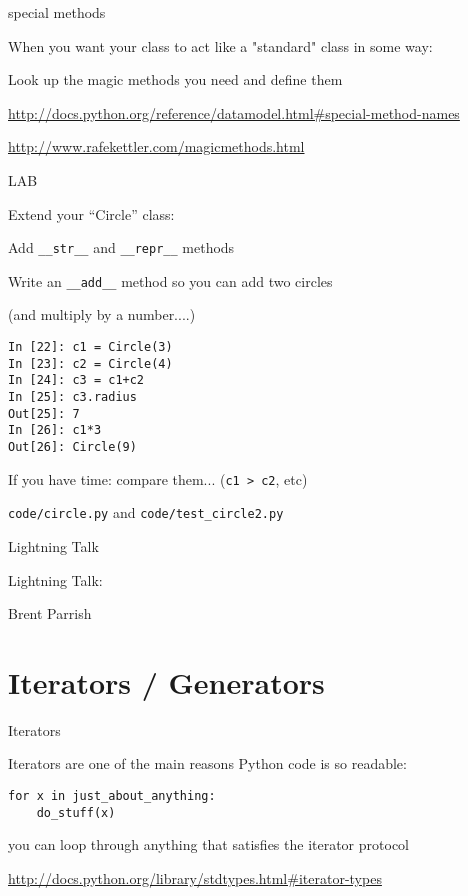 \documentclass{beamer}
\begin{document}
\begin{frame}[fragile]{special methods}

\vfill
{\Large When you want your class to act like a "standard" class in some way:}

\vfill
{\Large Look up the magic methods you need and define them}

\vfill
\url{http://docs.python.org/reference/datamodel.html#special-method-names}

\vfill
\url{http://www.rafekettler.com/magicmethods.html}
\end{frame} 

\begin{frame}[fragile]{LAB}

{\Large Extend your ``Circle'' class:}

\vfill
{\large Add \verb|__str__| and \verb|__repr__| methods }

\vfill
{\large Write an \verb|__add__| method so you can add two circles }

(and multiply by a number....)
\begin{verbatim}
In [22]: c1 = Circle(3)
In [23]: c2 = Circle(4)
In [24]: c3 = c1+c2
In [25]: c3.radius
Out[25]: 7
In [26]: c1*3
Out[26]: Circle(9)
\end{verbatim}
{\large If you have time: compare them... (\verb|c1 > c2|, etc)}

\vfill
{\large \verb|code/circle.py| and \verb|code/test_circle2.py|}
\end{frame}

\begin{frame}{Lightning Talk}

\vfill
{\LARGE Lightning Talk:  }

\vfill
{\Large Brent Parrish}


\vfill

\end{frame}


\section{Iterators / Generators}

\begin{frame}[fragile]{Iterators}

{\Large Iterators are one of the main reasons Python code is so readable:}

\begin{verbatim}
for x in just_about_anything:
    do_stuff(x)
\end{verbatim}

{\Large you can loop through anything that satisfies the iterator protocol}

\vfill
\url{http://docs.python.org/library/stdtypes.html#iterator-types}
\end{frame} 
\end{document}
